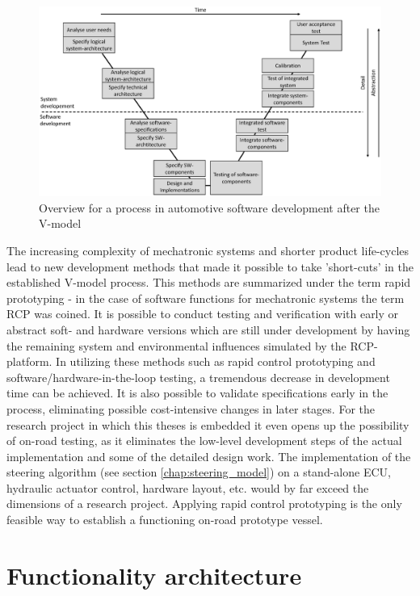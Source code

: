\documentclass[ExampleMasters.tex]{subfiles}
\begin{document}
\begin{figure}[!htb]
	\centering
	\includegraphics[width=0.9\linewidth]{figures/v_model/Folie1}
	\caption{Overview for a process in automotive software development after the V-model}
	\label{fig:v_model}
\end{figure}



The increasing complexity of mechatronic systems and shorter product life-cycles lead to new development methods that made it possible to take 'short-cuts' in the established V-model process. This methods are summarized under the term rapid prototyping - in the case of software functions for mechatronic systems the term \gls{RCP} was coined. It is possible to conduct testing and verification with early or abstract soft- and hardware versions which are still under development by having the remaining system and environmental influences simulated by the \gls{RCP}-platform. In utilizing these methods such as rapid control prototyping and software/hardware-in-the-loop testing, a tremendous decrease in development time can be achieved. It is also possible to validate specifications early in the process, eliminating possible cost-intensive changes in later stages\cite{rapidcontrolprototyping}. For the research project in which this theses is embedded it even opens up the possibility of on-road testing, as it eliminates the low-level development steps of the actual implementation and some of the detailed design work. The implementation of the steering algorithm (see section \ref{chap:steering_model}) on a stand-alone ECU, hydraulic actuator control, hardware layout, etc. would by far exceed the dimensions of a research project. Applying rapid control prototyping is the only feasible way to establish a functioning on-road prototype vessel.




\section{Functionality architecture}
\label{sec:func_architecture}
\end{document}
